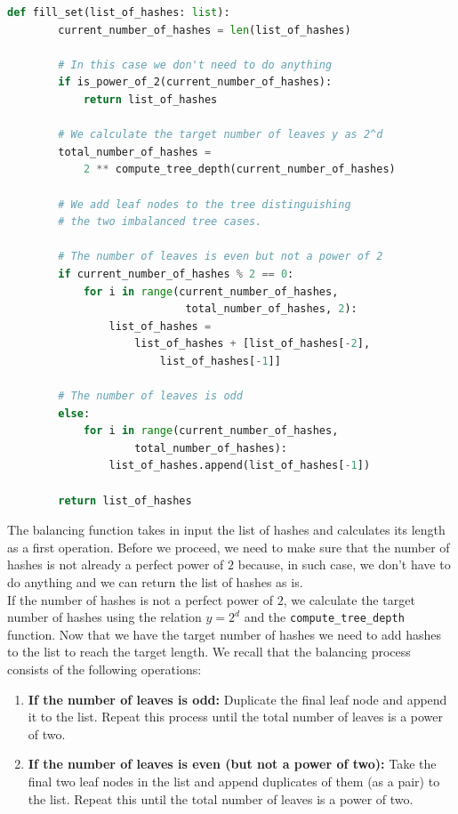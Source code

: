 \documentclass{scrbook}
\begin{document}
\begin{lstlisting}[language=Python, caption={Tree balancing function}]
    def fill_set(list_of_hashes: list):
        current_number_of_hashes = len(list_of_hashes)
    
        # In this case we don't need to do anything
        if is_power_of_2(current_number_of_hashes):
            return list_of_hashes
    
        # We calculate the target number of leaves y as 2^d
        total_number_of_hashes =
            2 ** compute_tree_depth(current_number_of_hashes)
    
        # We add leaf nodes to the tree distinguishing
        # the two imbalanced tree cases.
    
        # The number of leaves is even but not a power of 2
        if current_number_of_hashes % 2 == 0:
            for i in range(current_number_of_hashes,
                            total_number_of_hashes, 2):
                list_of_hashes =
                    list_of_hashes + [list_of_hashes[-2],
                        list_of_hashes[-1]]
    
        # The number of leaves is odd
        else:
            for i in range(current_number_of_hashes,
                    total_number_of_hashes):
                list_of_hashes.append(list_of_hashes[-1])
    
        return list_of_hashes
\end{lstlisting}

The balancing function takes in input the list of hashes and calculates its length as a first operation. Before we proceed, we need to make sure that the number of hashes is not already a perfect power of $2$ because, in such case, we don't have to do anything and we can return the list of hashes as is. \\

If the number of hashes is not a perfect power of $2$, we calculate the target number of hashes using the relation $y = 2^d$ and the \texttt{compute\_tree\_depth} function. Now that we have the target number of hashes we need to add hashes to the list to reach the target length. We recall that the balancing process consists of the following operations:

\begin{enumerate}
    \item \textbf{If the number of leaves is odd:} Duplicate the final leaf node and append it to the list. Repeat this process until the total number of leaves is a power of two.
    
    \item \textbf{If the number of leaves is even (but not a power of two):} Take the final two leaf nodes in the list and append duplicates of them (as a pair) to the list. Repeat this until the total number of leaves is a power of two.
\end{enumerate}
\end{document}
